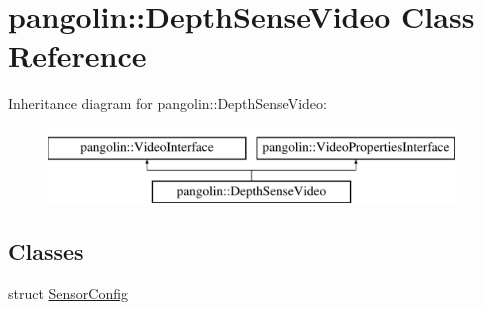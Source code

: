 \hypertarget{classpangolin_1_1_depth_sense_video}{}\section{pangolin\+:\+:Depth\+Sense\+Video Class Reference}
\label{classpangolin_1_1_depth_sense_video}
Inheritance diagram for pangolin\+:\+:Depth\+Sense\+Video\+:\begin{figure}[H]
\begin{center}
\leavevmode
\includegraphics[height=2.000000cm]{classpangolin_1_1_depth_sense_video}
\end{center}
\end{figure}
\subsection*{Classes}
\begin{DoxyCompactItemize}
\item 
struct \hyperlink{structpangolin_1_1_depth_sense_video_1_1_sensor_config}{Sensor\+Config}
\end{DoxyCompactItemize}

